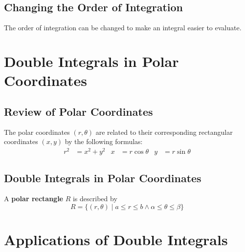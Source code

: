 \documentclass[../Calculus \Roman{3}.tex]{subfiles}
\begin{document}
		\subsection*{Changing the Order of Integration}
			The order of integration can be changed to make an integral easier to evaluate.
	\section{Double Integrals in Polar Coordinates}
		\subsection*{Review of Polar Coordinates}
			The polar coordinates $(r, \theta)$ are related to their corresponding rectangular coordinates $(x, y)$ by the following formulas:
			\begin{align*}
				r^2 &= x^2 + y^2 &
						x &= r\cos\theta &
						y &= r\sin\theta
			\end{align*}
		\subsection*{Double Integrals in Polar Coordinates}
				A \textbf{polar rectangle} $R$ is described by
					\[R = \{(r, \theta) \mid a \le r \le b \land \alpha \le \theta \le \beta\}\]
	\section{Applications of Double Integrals}
\end{document}
